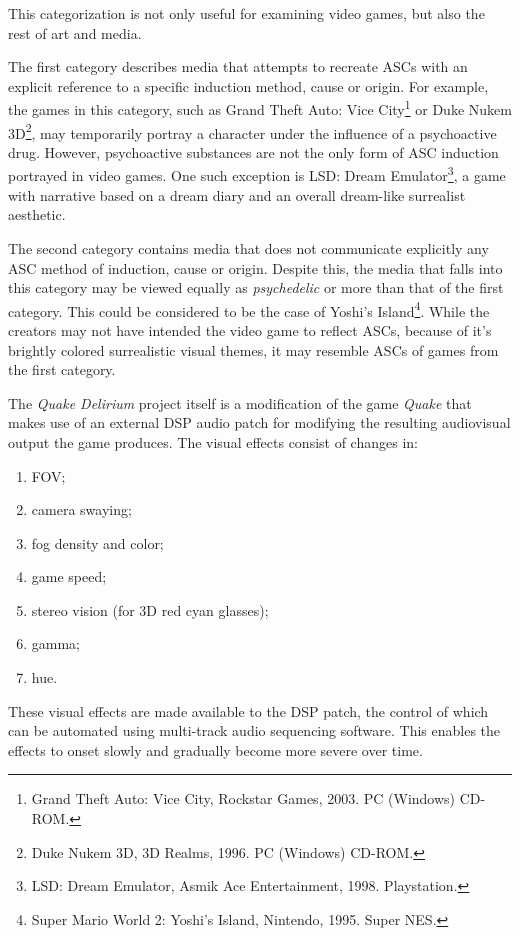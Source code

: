 This categorization is not only useful for examining video games, but also the rest of art and media.

The first category describes media that attempts to recreate \acp{ASC} with an explicit reference to a specific induction method, cause or origin. For example, the games in this category, such as {Grand Theft Auto: Vice City}\footnote{Grand Theft Auto: Vice City, Rockstar Games, 2003. PC (Windows) CD-ROM.} or {Duke Nukem 3D}\footnote{Duke Nukem 3D, 3D Realms, 1996. PC (Windows)
CD-ROM.}, may temporarily portray a character under the influence of a psychoactive drug. However, psychoactive substances are not the only form of \ac{ASC} induction portrayed in video games. One such exception is {LSD: Dream Emulator}\footnote{LSD: Dream Emulator, Asmik Ace Entertainment, 1998. Playstation.}, a game with narrative based on a dream diary and an overall dream-like surrealist aesthetic.

The second category contains media that does not communicate explicitly any \ac{ASC} method of induction, cause or origin. Despite this, the media that falls into this category may be viewed equally as \textit{psychedelic} or more than that of the first category. This could be considered to be the case of {Yoshi's Island}\footnote{Super Mario World 2: Yoshi’s Island, Nintendo, 1995. Super NES.}. While the creators may not have intended the video game to reflect \acp{ASC}, because of it's brightly colored surrealistic visual themes, it may resemble \acp{ASC} of games from the first category.

The \textit{Quake Delirium} project itself is a modification of the game \textit{Quake} that makes use of an external \ac{DSP} audio patch for modifying the resulting audiovisual output the game produces. The visual effects consist of changes in:

\begin{enumerate}
    \setlength{\itemsep}{0pt}
    \setlength{\parskip}{0pt}
    \item \ac{FOV};
    \item camera swaying;
    \item fog density and color;
    \item game speed;
    \item stereo vision (for 3D red cyan glasses);
    \item gamma;
    \item hue.
\end{enumerate}

These visual effects are made available to the \ac{DSP} patch, the control of which can be automated using multi-track audio sequencing software. This enables the effects to onset slowly and gradually become more severe over time.

